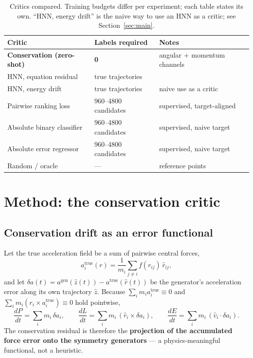 \documentclass[11pt]{article}
\begin{document}
\begin{table}[t]
\centering
\small
\caption{Critics compared. Training budgets differ per experiment; each table states
its own. ``HNN, energy drift'' is the naive way to use an HNN as a critic; see
Section~\ref{sec:main}.}
\label{tab:critics}
\begin{tabular}{lll}
\toprule
Critic & Labels required & Notes \\
\midrule
\textbf{Conservation (zero-shot)} & \textbf{0} & angular $+$ momentum channels \\
HNN, equation residual & true trajectories & \cite{greydanus2019hnn} \\
HNN, energy drift & true trajectories & naive use as a critic \\
Pairwise ranking loss & 960--4800 candidates & supervised, target-aligned \\
Absolute binary classifier & 960--4800 candidates & supervised, naive target \\
Absolute error regressor & 960--4800 candidates & supervised, naive target \\
Random / oracle & --- & reference points \\
\bottomrule
\end{tabular}
\end{table}

\section{Method: the conservation critic}

\subsection{Conservation drift as an error functional}

Let the true acceleration field be a sum of pairwise central forces,
\begin{equation}
a^{\text{true}}_i(r)=\frac{1}{m_i}\sum_{j\neq i} f(r_{ij})\,\hat{r}_{ij},
\end{equation}
and let $\delta a(t) = a^{\text{gen}}(\hat{z}(t)) - a^{\text{true}}(\hat{r}(t))$ be the
generator's acceleration error along its own trajectory $\hat{z}$. Because
$\sum_i m_i a^{\text{true}}_i \equiv 0$ and
$\sum_i m_i (r_i \times a^{\text{true}}_i) \equiv 0$ hold pointwise,
\begin{equation}
\label{eq:noether}
\frac{dP}{dt}=\sum_i m_i\,\delta a_i,\qquad
\frac{dL}{dt}=\sum_i m_i\,(\hat{r}_i\times\delta a_i),\qquad
\frac{dE}{dt}=\sum_i m_i\,(\hat{v}_i\cdot\delta a_i).
\end{equation}
The conservation residual is therefore the \textbf{projection of the accumulated force
error onto the symmetry generators} --- a physics-meaningful functional, not a
heuristic.
\end{document}
